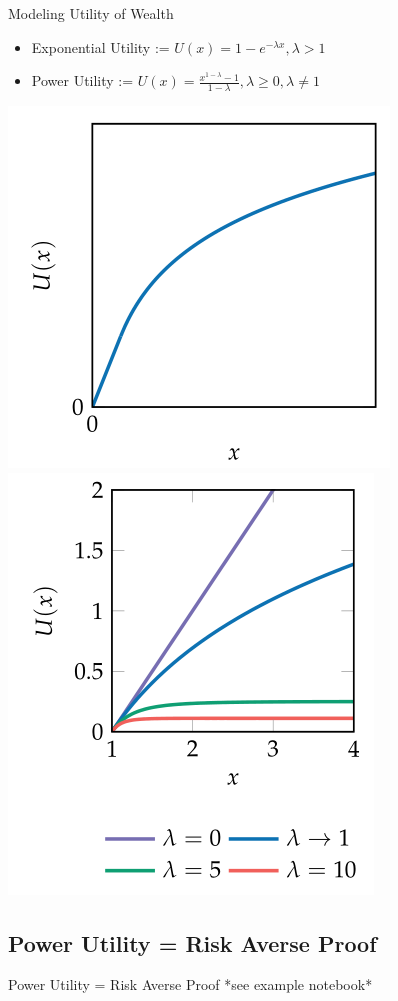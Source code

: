 \documentclass{beamer}
\begin{document}
\begin{frame}{Modeling Utility of Wealth}
\begin{itemize}
   \item Exponential Utility := $U(x) =1 - e^{-\lambda x}, \lambda > 1$
   \item Power Utility := $U(x) = \frac{x^{1-\lambda} - 1}{1 - \lambda}, \lambda \geq 0, \lambda \neq 1$
\end{itemize}
\includegraphics[scale=0.3]{figures/exponential_utility.png}
\includegraphics[scale=0.3]{figures/power_utility.png}
\end{frame}

\subsection{Power Utility = Risk Averse Proof}
\begin{frame}{Power Utility = Risk Averse Proof}
*see example notebook*
\end{frame}
\end{document}

